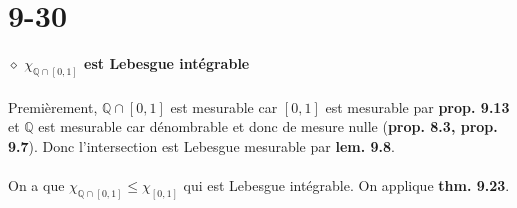 \documentclass[a4paper,10pt]{article}
\begin{document}
\section*{9-30}
$\diamond$ \textbf{$\chi_{\mathbb{Q} \cap [0,1]}$ est Lebesgue intégrable}
\\
\\
Premièrement, $\mathbb{Q} \cap [0,1]$ est mesurable car $[0,1]$ est mesurable par \textbf{prop. 9.13} et $\mathbb{Q}$ est mesurable car dénombrable et donc de mesure nulle (\textbf{prop. 8.3, prop. 9.7}). Donc l'intersection est Lebesgue mesurable par \textbf{lem. 9.8}.
\\
\\
On a que $\chi_{\mathbb{Q} \cap [0,1]} \leq \chi_{[0,1]}$ qui est Lebesgue intégrable. On applique \textbf{thm. 9.23}.
\end{document}
